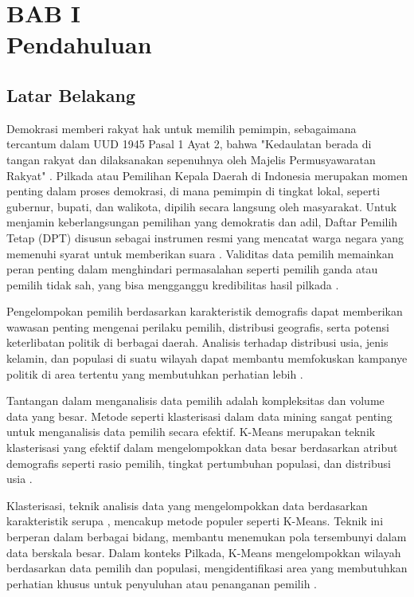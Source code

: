 \section*{\centering BAB I \\ Pendahuluan}

\setcounter{section}{1}

\subsection{Latar Belakang}
Demokrasi memberi rakyat hak untuk memilih pemimpin, sebagaimana tercantum dalam UUD 1945 Pasal 1 Ayat 2, bahwa "Kedaulatan berada di tangan rakyat dan dilaksanakan sepenuhnya oleh Majelis Permusyawaratan Rakyat" \cite{PasalDemokrasi}. Pilkada atau Pemilihan Kepala Daerah di Indonesia merupakan momen penting dalam proses demokrasi, di mana pemimpin di tingkat lokal, seperti gubernur, bupati, dan walikota, dipilih secara langsung oleh masyarakat. Untuk menjamin keberlangsungan pemilihan yang demokratis dan adil, Daftar Pemilih Tetap (DPT) disusun sebagai instrumen resmi yang mencatat warga negara yang memenuhi syarat untuk memberikan suara \cite{DPTPilkada}. Validitas data pemilih memainkan peran penting dalam menghindari permasalahan seperti pemilih ganda atau pemilih tidak sah, yang bisa mengganggu kredibilitas hasil pilkada \cite{InstrumenDpt}.

Pengelompokan pemilih berdasarkan karakteristik demografis dapat memberikan wawasan penting mengenai perilaku pemilih, distribusi geografis, serta potensi keterlibatan politik di berbagai daerah. Analisis terhadap distribusi usia, jenis kelamin, dan populasi di suatu wilayah dapat membantu memfokuskan kampanye politik di area tertentu yang membutuhkan perhatian lebih \cite{ImplementasiDataPemilihBerkelanjutan}.

Tantangan dalam menganalisis data pemilih adalah kompleksitas dan volume data yang besar. Metode seperti klasterisasi dalam data mining sangat penting untuk menganalisis data pemilih secara efektif.  K-Means merupakan teknik klasterisasi yang efektif dalam mengelompokkan data besar berdasarkan atribut demografis seperti rasio pemilih, tingkat pertumbuhan populasi, dan distribusi usia \cite{KMeansMethod}.

Klasterisasi, teknik analisis data yang mengelompokkan data berdasarkan karakteristik serupa \cite{FormulaKMeans}, mencakup metode populer seperti K-Means. Teknik ini berperan dalam berbagai bidang, membantu menemukan pola tersembunyi dalam data berskala besar. Dalam konteks Pilkada, K-Means mengelompokkan wilayah berdasarkan data pemilih dan populasi, mengidentifikasi area yang membutuhkan perhatian khusus untuk penyuluhan atau penanganan pemilih \cite{DataMiningTechniques}.

